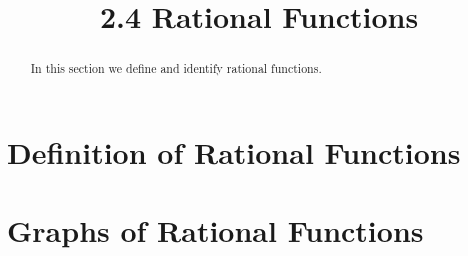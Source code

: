 \documentclass[handout]{ximera}
\title{2.4 Rational Functions}
\begin{document}
\begin{abstract}
In this section we define and identify rational functions.
\end{abstract}

\maketitle


\section{Definition of Rational Functions}




\section{Graphs of Rational Functions}
\end{document}
